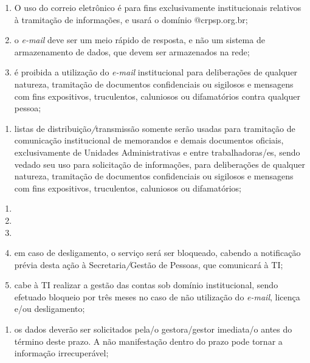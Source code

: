 \documentclass[openright, twoside, a4paper]{memoir}
\begin{document}
\begin{enumerate}

\item
    O uso do correio eletrônico é para fins exclusivamente institucionais
    relativos à tramitação de informações, e usará o domínio
    @crpsp.org.br;
\item
    o \emph{e-mail} deve ser um meio rápido de resposta, e não um sistema
    de armazenamento de dados, que devem ser armazenados na rede;
\item
    é proibida a utilização do \emph{e-mail} institucional para
    deliberações de qualquer natureza, tramitação de documentos
    confidenciais ou sigilosos e mensagens com fins expositivos,
    truculentos, caluniosos ou difamatórios contra qualquer pessoa;
\end{enumerate}

\begin{enumerate}
\def\labelenumi{\roman{enumi}.}
\item
    listas de distribuição\emph{/}transmissão somente serão usadas para
    tramitação de comunicação institucional de memorandos e demais
    documentos oficiais, exclusivamente de Unidades Administrativas e
    entre trabalhadoras/es, sendo vedado seu uso para solicitação de
    informações, para deliberações de qualquer natureza, tramitação de
    documentos confidenciais ou sigilosos e mensagens com fins
    expositivos, truculentos, caluniosos ou difamatórios;
\end{enumerate}

\begin{enumerate}

\item
\item
\item
\item
    em caso de desligamento, o serviço será ser bloqueado, cabendo a
    notificação prévia desta ação à Secretaria\emph{/}Gestão de Pessoas,
    que comunicará à TI;
\item
    cabe à TI realizar a gestão das contas sob domínio institucional,
    sendo efetuado bloqueio por três meses no caso de não utilização do
    \emph{e-mail}, licença e/ou desligamento;
\end{enumerate}

\begin{enumerate}
\def\labelenumi{\roman{enumi}.}
\item
    os dados deverão ser solicitados pela/o gestora/gestor imediata/o
    antes do término deste prazo. A não manifestação dentro do prazo pode
    tornar a informação irrecuperável;
\end{enumerate}
\end{document}

